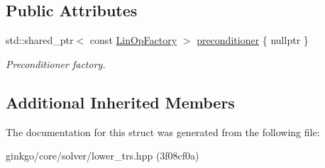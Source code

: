 \subsection*{Public Attributes}
\begin{DoxyCompactItemize}
\item 
\mbox{\label{structgko_1_1solver_1_1LowerTrs_1_1parameters__type_afebfcb78e6e519c5f720e9a984af0f36}} 
std\+::shared\+\_\+ptr$<$ const \hyperlink{classgko_1_1LinOpFactory}{Lin\+Op\+Factory} $>$ \hyperlink{structgko_1_1solver_1_1LowerTrs_1_1parameters__type_afebfcb78e6e519c5f720e9a984af0f36}{preconditioner} \{ nullptr \}
\begin{DoxyCompactList}\small\item\em Preconditioner factory. \end{DoxyCompactList}\end{DoxyCompactItemize}
\subsection*{Additional Inherited Members}


The documentation for this struct was generated from the following file\+:\begin{DoxyCompactItemize}
\item 
ginkgo/core/solver/lower\+\_\+trs.\+hpp (3f08cf0a)\end{DoxyCompactItemize}
